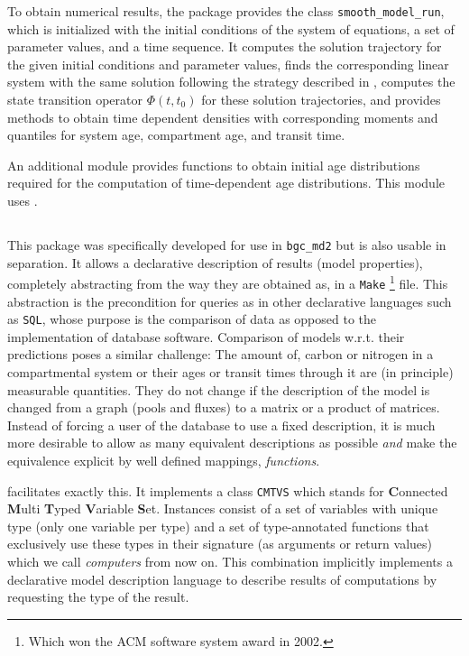 To obtain numerical results, the package
provides the class \texttt{smooth\_model\_run}, which is initialized with the initial
conditions of the system of equations, a set of parameter values, and a time
sequence. It computes the solution trajectory for the given initial conditions and
parameter values, finds the corresponding linear system with the same solution
following the strategy described in , computes the
state transition operator $\Phi(t, t_0)$ for these solution trajectories, and 
provides methods to obtain time dependent densities with corresponding moments and quantiles for system age, compartment age, and transit time. 

An additional module provides functions to obtain initial age distributions
required for the computation of time-dependent age distributions. 
This module uses \LAPM{}. 

\subsection{\ComputabilityGraphs{}}
This package was specifically developed for use in \texttt{bgc\_md2} but is also usable in separation.
It allows a declarative description of results (model properties), \ie completely abstracting from the way they are obtained as, \eg in a \texttt{Make} 
\footnote{Which won the ACM software system award in 2002.} file.  This
abstraction is the precondition for queries as in other declarative languages
such as \texttt{SQL}, whose purpose is the comparison of data as opposed to
the implementation of database software.  Comparison of models w.r.t. their
predictions poses a similar challenge: The amount of, \eg carbon or nitrogen in
a compartmental system or their ages or transit times through it are (in
principle) measurable quantities. They do not change if the description of the
model is changed from a graph (pools and fluxes) to a matrix or a product of matrices.
Instead of forcing a user of the database to use a fixed
description, it is much more desirable to allow as many equivalent descriptions as
possible \emph{and} make the equivalence explicit by  well defined mappings, \ie \emph{functions}.

\ComputabilityGraphs{} facilitates exactly this.
It implements a class \texttt{CMTVS} which stands for 
{\bf C}onnected {\bf M}ulti {\bf T}yped {\bf V}ariable {\bf S}et. 
Instances consist of a set of variables with unique type (only one variable per type)  and a set of type-annotated functions that exclusively 
use these types in their signature (as arguments or return values) which we call \emph{computers} from now on.
This combination implicitly implements a declarative model description language to describe results of computations by requesting the type of the result. 


